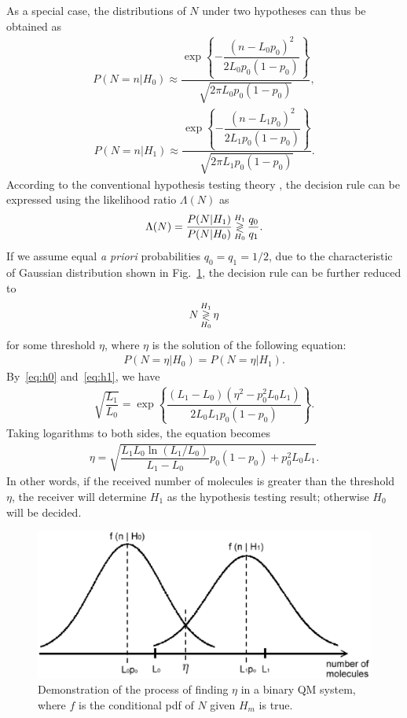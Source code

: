 As a special case, the distributions of $N$ under two hypotheses can thus be obtained as
\begin{eqnarray}
P(N=n| H_0) \approx \dfrac{\exp\left\{-\dfrac{(n-L_0p_0)^2}{2L_0p_0(1-p_0)}\right\}}{\sqrt{2\pi L_0p_0(1-p_0)}}, \label{eq:h0}
\end{eqnarray}
\begin{eqnarray}
P(N=n| H_1) \approx \dfrac{\exp\left\{-\dfrac{(n-L_1p_0)^2}{2L_1p_0(1-p_0)}\right\}}{\sqrt{2\pi L_1p_0(1-p_0)}}. \label{eq:h1}
\end{eqnarray}
According to the conventional hypothesis testing theory \cite{vanTree, poor},
the decision rule can be expressed using the likelihood ratio $\Lambda(N)$ as
\begin{eqnarray}
\Lambda(N) =  \dfrac{P(N| H_1)}{P(N| H_0)} \decision ^{H_1}_{H_0} \dfrac{q_0}{q_1}.
\end{eqnarray}
If we assume equal \emph{a priori} probabilities $q_0=q_1=1/2$, due to the characteristic of Gaussian distribution shown in Fig.~\ref{fig:gaussian},  the decision rule can be further reduced to
\begin{eqnarray}
N \decision ^{H_1}_{H_0} \eta
\end{eqnarray}
for some threshold $\eta$,
where $\eta$ is the solution of the following equation:
\begin{eqnarray}
P(N = \eta | H_0) = P(N = \eta | H_1).
\end{eqnarray}
By~\eqref{eq:h0} and~\eqref{eq:h1}, we have
\begin{eqnarray}
\sqrt{ \dfrac{L_1}{L_0} } = \exp \left\{  \dfrac{(L_1-L_0) (\eta^2 - p_0^2L_0L_1) }{2 L_0 L_1 p_0(1-p_0)} \right\}.
\end{eqnarray}
Taking logarithms to both sides, the equation becomes
\begin{eqnarray}
\eta = \sqrt{ \dfrac{ L_1L_0\ln (L_1/L_0) }{L_1-L_0}p_0(1-p_0)+p_0^2L_0L_1 }. \label{eq:threshold}
\end{eqnarray}
In other words, if the received number of molecules is greater than the threshold $\eta$,  the receiver will determine $H_1$ as the hypothesis testing result; otherwise $H_0$ will be decided.

\begin{figure}[htb]
\centering
\includegraphics[width=5.5in, keepaspectratio]{QM/gaussian.eps}
\caption{Demonstration of the process of finding $\eta$ in a binary QM system, where $f$ is the conditional pdf of $N$ given $H_m$ is true.} \label{fig:gaussian}
\end{figure}

